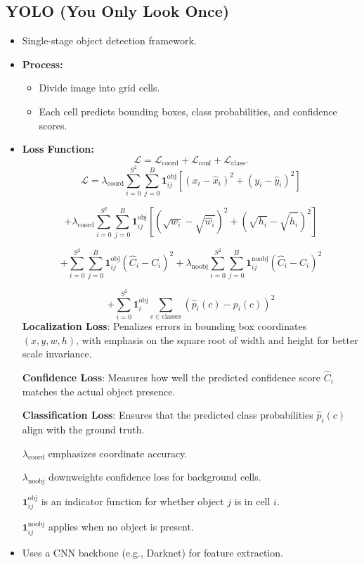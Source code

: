 \documentclass[12pt,a4paper]{article}
\begin{document}
\subsection{YOLO (You Only Look Once)}
\begin{itemize}
    \item Single-stage object detection framework.
    \item \textbf{Process:}
    \begin{itemize}
        \item Divide image into grid cells.
        \item Each cell predicts bounding boxes, class probabilities, and confidence scores.
    \end{itemize}
    \item \textbf{Loss Function:}
    \[ \mathcal{L} = \mathcal{L}_{\text{coord}} + \mathcal{L}_{\text{conf}} + \mathcal{L}_{\text{class}}. \]
    \[
\mathcal{L} = \lambda_{\text{coord}} \sum_{i=0}^{S^2} \sum_{j=0}^{B} \mathbf{1}_{ij}^{\text{obj}} 
\left[ (x_i - \hat{x}_i)^2 + (y_i - \hat{y}_i)^2 \right]
\]

\[
+ \lambda_{\text{coord}} \sum_{i=0}^{S^2} \sum_{j=0}^{B} \mathbf{1}_{ij}^{\text{obj}} 
\left[ (\sqrt{w_i} - \sqrt{\hat{w}_i})^2 + (\sqrt{h_i} - \sqrt{\hat{h}_i})^2 \right]
\]

\[
+ \sum_{i=0}^{S^2} \sum_{j=0}^{B} \mathbf{1}_{ij}^{\text{obj}} (\hat{C}_i - C_i)^2
+ \lambda_{\text{noobj}} \sum_{i=0}^{S^2} \sum_{j=0}^{B} \mathbf{1}_{ij}^{\text{noobj}} ( \hat{C}_i - C_i)^2
\]

\[
+ \sum_{i=0}^{S^2} \mathbf{1}_{i}^{\text{obj}} \sum_{c \in \text{classes}} (\hat{p}_i(c) - p_i(c))^2
\]
\textbf{Localization Loss}: Penalizes errors in bounding box coordinates 
\((x, y, w, h)\), with emphasis on the square root of width and height for better scale invariance.

\textbf{Confidence Loss}: Measures how well the predicted confidence score \(\hat{C}_i\) matches the actual object presence.

\textbf{Classification Loss}: Ensures that the predicted class probabilities \(\hat{p}_i(c)\) align with the ground truth.

\(\lambda_{\text{coord}}\) emphasizes coordinate accuracy.

\(\lambda_{\text{noobj}}\) downweights confidence loss for background cells.

\(\mathbf{1}_{ij}^{\text{obj}}\) is an indicator function for whether object \(j\) is in cell \(i\).

\(\mathbf{1}_{ij}^{\text{noobj}}\) applies when no object is present.

    \item Uses a CNN backbone (e.g., Darknet) for feature extraction.
\end{itemize}
\end{document}
